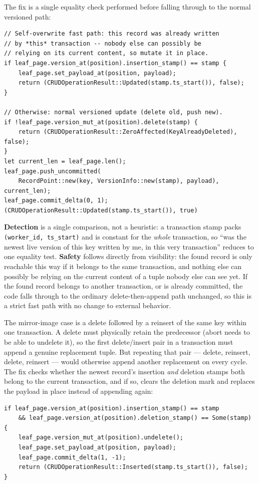 \documentclass[11pt]{article}
\newcommand{\code}[1]{\texttt{#1}}
\begin{document}
The fix is a single equality check performed before falling through to the normal
versioned path:

\begin{lstlisting}
// Self-overwrite fast path: this record was already written
// by *this* transaction -- nobody else can possibly be
// relying on its current content, so mutate it in place.
if leaf_page.version_at(position).insertion_stamp() == stamp {
    leaf_page.set_payload_at(position, payload);
    return (CRUDOperationResult::Updated(stamp.ts_start()), false);
}

// Otherwise: normal versioned update (delete old, push new).
if !leaf_page.version_mut_at(position).delete(stamp) {
    return (CRUDOperationResult::ZeroAffected(KeyAlreadyDeleted), false);
}
let current_len = leaf_page.len();
leaf_page.push_uncommitted(
    RecordPoint::new(key, VersionInfo::new(stamp), payload), current_len);
leaf_page.commit_delta(0, 1);
(CRUDOperationResult::Updated(stamp.ts_start()), true)
\end{lstlisting}

\textbf{Detection} is a single comparison, not a heuristic: a transaction stamp
packs \code{(worker\_id, ts\_start)} and is constant for the \emph{whole}
transaction, so ``was the newest live version of this key written by me, in this
very transaction'' reduces to one equality test. \textbf{Safety} follows directly
from visibility: the found record is only reachable this way if it belongs to the
same transaction, and nothing else can possibly be relying on the current content of
a tuple nobody else can see yet. If the found record belongs to another transaction,
or is already committed, the code falls through to the ordinary
delete-then-append path unchanged, so this is a strict fast path with no change to
external behavior.

The mirror-image case is a delete followed by a reinsert of the same key within one
transaction. A delete must physically retain the predecessor (abort needs to be able
to undelete it), so the first delete/insert pair in a transaction must append a
genuine replacement tuple. But repeating that pair --- delete, reinsert, delete,
reinsert --- would otherwise append another replacement on every cycle. The fix
checks whether the newest record's insertion \emph{and} deletion stamps both belong
to the current transaction, and if so, clears the deletion mark and replaces the
payload in place instead of appending again:

\begin{lstlisting}
if leaf_page.version_at(position).insertion_stamp() == stamp
    && leaf_page.version_at(position).deletion_stamp() == Some(stamp)
{
    leaf_page.version_mut_at(position).undelete();
    leaf_page.set_payload_at(position, payload);
    leaf_page.commit_delta(1, -1);
    return (CRUDOperationResult::Inserted(stamp.ts_start()), false);
}
\end{lstlisting}
\end{document}
